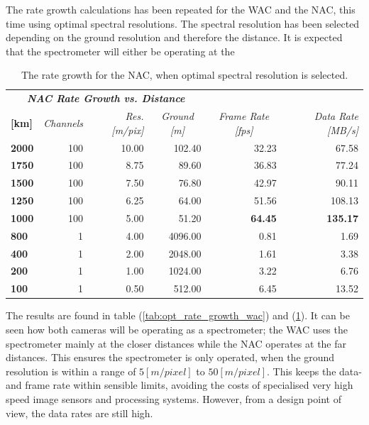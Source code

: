 The rate growth calculations has been repeated for the WAC and the NAC, this time using optimal spectral resolutions. The spectral resolution has been selected depending on the ground resolution and therefore the distance. It is expected that the spectrometer will either be operating at the 
\begin{table}[htb]
  \centering
    \begin{tabular}{l|r|r|r|r|r|}
\multicolumn{4}{c|}{\textit{\textbf{NAC Rate Growth vs. Distance}}} & \multicolumn{1}{r}{} & \multicolumn{1}{r}{} \bigstrut[b]\\
\cline{1-4}\textbf{[km]} & \textit{Channels} & \textit{Res. [m/pix]} & \multicolumn{1}{c|}{\textit{Ground [m]}} & \multicolumn{1}{c}{\textit{Frame Rate [fps]}} & \multicolumn{1}{r}{\textit{Data Rate [MB/s]}} \bigstrut\\
\hline
\textbf{2000} & 100   & 10.00 & 102.40 & 32.23 & 67.58 \bigstrut[t]\\
\textbf{1750} & 100   & 8.75  & 89.60 & 36.83 & 77.24 \\
\textbf{1500} & 100   & 7.50  & 76.80 & 42.97 & 90.11 \\
\textbf{1250} & 100   & 6.25  & 64.00 & 51.56 & 108.13 \\
\textbf{1000} & 100   & 5.00  & 51.20 & \textbf{64.45} & \textbf{135.17} \\
\textbf{800} & 1     & 4.00  & 4096.00 & 0.81  & 1.69 \\
\textbf{400} & 1     & 2.00  & 2048.00 & 1.61  & 3.38 \\
\textbf{200} & 1     & 1.00  & 1024.00 & 3.22  & 6.76 \\
\textbf{100} & 1     & 0.50  & 512.00 & 6.45  & 13.52 \\
\end{tabular}%
  \caption{The rate growth for the NAC, when optimal spectral resolution is selected.}
  \label{tab:opt_rate_growth_nac}%
\end{table}%
The results are found in table (\ref{tab:opt_rate_growth_wac}) and (\ref{tab:opt_rate_growth_nac}). It can be seen how both cameras will be operating as a spectrometer; the WAC uses the spectrometer mainly at the closer distances while the NAC operates at the far distances. This ensures the spectrometer is only operated, when the ground resolution is within a range of $5[m/pixel]$ to $50[m/pixel]$. This keeps the data- and frame rate within sensible limits, avoiding the costs of specialised very high speed image sensors and processing systems. However, from a design point of view, the data rates are still high. 

